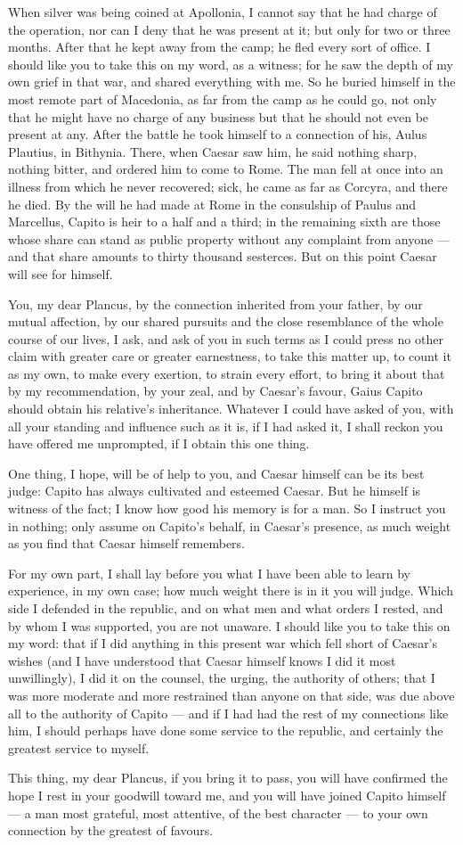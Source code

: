  When silver was being coined at Apollonia, I cannot say that he had charge of the operation, nor can I deny that he was present at it; but only for two or three months. After that he kept away from the camp; he fled every sort of office. I should like you to take this on my word, as a witness; for he saw the depth of my own grief in that war, and shared everything with me. So he buried himself in the most remote part of Macedonia, as far from the camp as he could go, not only that he might have no charge of any business but that he should not even be present at any. After the battle he took himself to a connection of his, Aulus Plautius, in Bithynia. There, when Caesar saw him, he said nothing sharp, nothing bitter, and ordered him to come to Rome. The man fell at once into an illness from which he never recovered; sick, he came as far as Corcyra, and there he died. By the will he had made at Rome in the consulship of Paulus and Marcellus, Capito is heir to a half and a third; in the remaining sixth are those whose share can stand as public property without any complaint from anyone --- and that share amounts to thirty thousand sesterces. But on this point Caesar will see for himself.

 You, my dear Plancus, by the connection inherited from your father, by our mutual affection, by our shared pursuits and the close resemblance of the whole course of our lives, I ask, and ask of you in such terms as I could press no other claim with greater care or greater earnestness, to take this matter up, to count it as my own, to make every exertion, to strain every effort, to bring it about that by my recommendation, by your zeal, and by Caesar's favour, Gaius Capito should obtain his relative's inheritance. Whatever I could have asked of you, with all your standing and influence such as it is, if I had asked it, I shall reckon you have offered me unprompted, if I obtain this one thing.

 One thing, I hope, will be of help to you, and Caesar himself can be its best judge: Capito has always cultivated and esteemed Caesar. But he himself is witness of the fact; I know how good his memory is for a man. So I instruct you in nothing; only assume on Capito's behalf, in Caesar's presence, as much weight as you find that Caesar himself remembers.

 For my own part, I shall lay before you what I have been able to learn by experience, in my own case; how much weight there is in it you will judge. Which side I defended in the republic, and on what men and what orders I rested, and by whom I was supported, you are not unaware. I should like you to take this on my word: that if I did anything in this present war which fell short of Caesar's wishes (and I have understood that Caesar himself knows I did it most unwillingly), I did it on the counsel, the urging, the authority of others; that I was more moderate and more restrained than anyone on that side, was due above all to the authority of Capito --- and if I had had the rest of my connections like him, I should perhaps have done some service to the republic, and certainly the greatest service to myself.

 This thing, my dear Plancus, if you bring it to pass, you will have confirmed the hope I rest in your goodwill toward me, and you will have joined Capito himself --- a man most grateful, most attentive, of the best character --- to your own connection by the greatest of favours.
